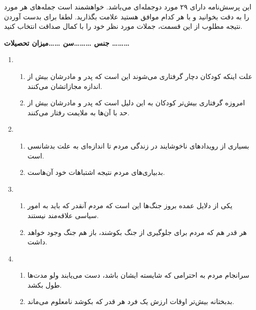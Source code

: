 \documentclass[a4paper,10pt]{article}
\title{}
\author{}
\date{}
\begin{document}
این پرسش‌نامه دارای ۲۹ مورد دوجمله‌ای می‌باشد. خواهشمند است جمله‌های هر مورد را به دقت بخوانید و با هر کدام موافق هستید علامت بگذارید.
لطفا برای بدست آوردن نتیجه مطلوب از این قسمت، جملات مورد نظر خود را با کمال صداقت انتخاب کنید.
\vspace{0.5cm}
\hline
\vspace{0.25cm}
\begin{center}
\textbf{جنس \ldots \ldots \ldots سن \ldots \ldots میزان تحصیلات \ldots \ldots \ldots} 
\end{center}
\vspace{0.25cm}
\hline
\vspace{0.25cm}
\begin{enumerate}
 
 \item \begin{enumerate}
        \item علت اینکه کودکان دچار گرفتاری می‌شوند این است که پدر و مادرشان بیش از اندازه مجازاتشان می‌کنند.
	\item امروزه گرفتاری بیش‌تر کودکان به این دلیل است که پدر و مادرشان بیش از حد با آن‌ها به ملایمت رفتار می‌کنند.
       \end{enumerate}

\hdashline

 \item \begin{enumerate}
        \item بسیاری از رویدادهای ناخوشایند در زندگی مردم تا اندازه‌ای به علت بدشانسی است.
	\item بدبیاری‌های مردم نتیجه اشتباهات خود آن‌هاست.
       \end{enumerate}

\hdashline

 \item \begin{enumerate}
        \item یکی از دلایل عمده بروز جنگ‌ها این است که مردم آنقدر که باید به امور سیاسی علاقه‌مند نیستند.
	\item هر قدر هم که مردم برای جلوگیری از جنگ بکوشند، باز هم جنگ وجود خواهد داشت.
       \end{enumerate}

\hdashline

 \item \begin{enumerate}
        \item سرانجام مردم به احترامی که شایسته ایشان باشد، دست می‌یابند ولو مدت‌ها طول بکشد.
	\item بدبختانه بیش‌تر اوقات ارزش یک فرد هر قدر که بکوشد نامعلوم می‌ماند.
       \end{enumerate}



\end{enumerate}
\end{document}
